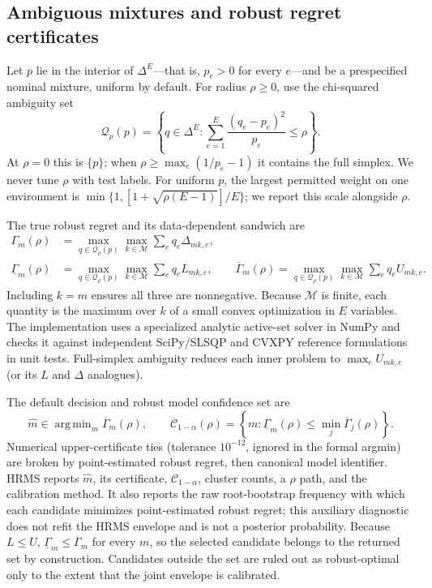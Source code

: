 \documentclass{article}
\DeclareMathOperator*{\argmin}{arg\,min}
\newcommand{\M}{\mathcal{M}}
\newcommand{\Q}{\mathcal{Q}}
\newcommand{\RRlo}{\underline{\Gamma}}
\newcommand{\RRhi}{\overline{\Gamma}}
\begin{document}
\subsection{Ambiguous mixtures and robust regret certificates}

Let $p$ lie in the interior of $\Delta^E$---that is, $p_e>0$ for every $e$---and be a prespecified nominal mixture, uniform by default.  For radius $\rho\geq0$, use the chi-squared ambiguity set
\begin{equation}
\Q_\rho(p)=\left\{q\in\Delta^E:
\sum_{e=1}^E\frac{(q_e-p_e)^2}{p_e}\leq\rho\right\}.
\label{eq:ambiguity}
\end{equation}
At $\rho=0$ this is $\{p\}$; when $\rho\geq\max_e(1/p_e-1)$ it contains the full simplex.  We never tune $\rho$ with test labels.  For uniform $p$, the largest permitted weight on one environment is $\min\{1,[1+\sqrt{\rho(E-1)}]/E\}$; we report this scale alongside $\rho$.

The true robust regret and its data-dependent sandwich are
\begin{align}
\Gamma_m(\rho)&=\max_{q\in\Q_\rho(p)}\max_{k\in\M}\sum_eq_e\Delta_{mk,e},\label{eq:truegamma}\\
\RRlo_m(\rho)&=\max_{q\in\Q_\rho(p)}\max_{k\in\M}\sum_eq_eL_{mk,e},\qquad
\RRhi_m(\rho)=\max_{q\in\Q_\rho(p)}\max_{k\in\M}\sum_eq_eU_{mk,e}.
\label{eq:gammabounds}
\end{align}
Including $k=m$ ensures all three are nonnegative.  Because $\M$ is finite, each quantity is the maximum over $k$ of a small convex optimization in $E$ variables.  The implementation uses a specialized analytic active-set solver in NumPy and checks it against independent SciPy/SLSQP and CVXPY reference formulations in unit tests.  Full-simplex ambiguity reduces each inner problem to $\max_e U_{mk,e}$ (or its $L$ and $\Delta$ analogues).

The default decision and robust model confidence set are
\begin{equation}
\widehat m\in\argmin_m\RRhi_m(\rho),\qquad
\mathcal C_{1-\alpha}(\rho)=
\left\{m:\RRlo_m(\rho)\leq\min_j\RRhi_j(\rho)\right\}.
\label{eq:decision}
\end{equation}
Numerical upper-certificate ties (tolerance $10^{-12}$, ignored in the formal argmin) are broken by point-estimated robust regret, then canonical model identifier.  HRMS reports $\widehat m$, its certificate, $\mathcal C_{1-\alpha}$, cluster counts, a $\rho$ path, and the calibration method.  It also reports the raw root-bootstrap frequency with which each candidate minimizes point-estimated robust regret; this auxiliary diagnostic does not refit the HRMS envelope and is not a posterior probability.
Because $L\leq U$, $\RRlo_m\leq\RRhi_m$ for every $m$, so the selected candidate belongs to the returned set by construction.  Candidates outside the set are ruled out as robust-optimal only to the extent that the joint envelope is calibrated.
\end{document}
